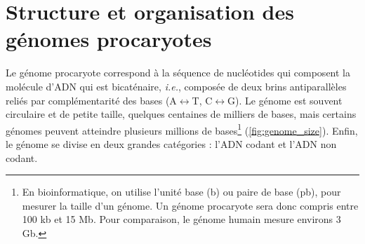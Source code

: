 \section{Structure et organisation des génomes procaryotes}
\label{sec:structure_org}


Le génome procaryote correspond à la séquence de nucléotides qui composent la molécule d'ADN qui est bicaténaire, \textit{i.e.}, composée de deux brins antiparallèles reliés par complémentarité des bases (A$\leftrightarrow$T, C$\leftrightarrow$G). Le génome est souvent circulaire et de petite taille, quelques centaines de milliers de bases, mais certains génomes peuvent atteindre plusieurs millions de bases\footnote{En bioinformatique, on utilise l'unité base (b) ou paire de base (pb), pour mesurer la taille d'un génome. Un génome procaryote sera donc compris entre 100 kb et 15 Mb. Pour comparaison, le génome humain mesure environs 3 Gb.} (\autoref{fig:genome_size}). Enfin, le génome se divise en deux grandes catégories : l'ADN codant et l'ADN non codant.

